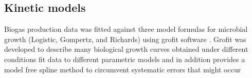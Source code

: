 \subsection{Kinetic models}
Biogas production data was fitted against three model formulas for microbial growth (Logistic, Gompertz, and Richards) using grofit software \cite{Kahm_2010}. Grofit was developed to describe many biological growth curves obtained under different conditions fit data to different parametric models and in
addition provides a model free spline method to circumvent systematic errors that might
occur